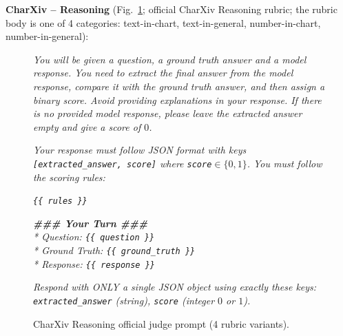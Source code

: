 \documentclass{llmxive}
\begin{document}
\textbf{CharXiv -- Reasoning} (Fig.~\ref{fig:prompt-judge-charxiv-r}; official CharXiv Reasoning rubric; the rubric body is one of 4 categories: text-in-chart, text-in-general, number-in-chart, number-in-general):
\begin{figure}[!htbp]
\begin{prompttemplatefig}
\small
\emph{You will be given a question, a ground truth answer and a model response. You need to extract the final answer from the model response, compare it with the ground truth answer, and then assign a binary score. Avoid providing explanations in your response. If there is no provided model response, please leave the extracted answer empty and give a score of $0$.}

\emph{Your response must follow JSON format with keys \texttt{[extracted\_answer, score]} where \texttt{score}$\in\{0,1\}$. You must follow the scoring rules:}

\emph{\texttt{\{\{ rules \}\}}}

\emph{\textbf{\#\#\# Your Turn \#\#\#}\\
* Question: \texttt{\{\{ question \}\}}\\
* Ground Truth: \texttt{\{\{ ground\_truth \}\}}\\
* Response: \texttt{\{\{ response \}\}}}

\emph{Respond with ONLY a single JSON object using exactly these keys: \texttt{extracted\_answer} (string), \texttt{score} (integer $0$ or $1$).}
\end{prompttemplatefig}
\caption{CharXiv Reasoning official judge prompt (4 rubric variants).}
\label{fig:prompt-judge-charxiv-r}
\end{figure}
\end{document}
